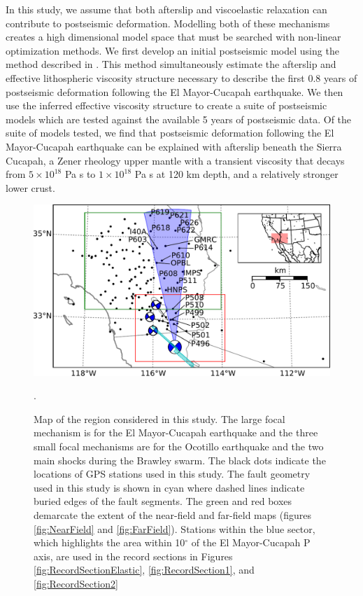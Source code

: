 \documentclass[review]{elsarticle}
\begin{document}
In this study, we assume that both afterslip and viscoelastic relaxation can contribute to postseismic deformation. Modelling both of these mechanisms creates a high dimensional model space that must be searched with non-linear optimization methods. We first develop an initial postseismic model using the method described in \citet{Hines2016}. This method simultaneously estimate the afterslip and effective lithospheric viscosity structure necessary to describe the first 0.8 years of postseismic deformation following the El Mayor-Cucapah earthquake.  We then use the inferred effective viscosity structure to create a suite of postseismic models which are tested against the available 5 years of postseismic data.  Of the suite of models tested, we find that postseismic deformation following the El Mayor-Cucapah earthquake can be explained with afterslip beneath the Sierra Cucapah, a Zener rheology upper mantle with a transient viscosity that decays from $5\times10^{18}$ Pa s to $1\times10^{18}$ Pa s at 120 km depth, and a relatively stronger lower crust. 

\begin{figure}
\includegraphics[scale=0.7]{Figures/ContextMap} 
\caption{Map of the region considered in this study.  The large focal mechanism is for the El Mayor-Cucapah earthquake and the three small focal mechanisms are for the Ocotillo earthquake and the two main shocks during the Brawley swarm.  The black dots indicate the locations of GPS stations used in this study.  The fault geometry used in this study is shown in cyan where dashed lines indicate buried edges of the fault segments.  The green and red boxes demarcate the extent of the near-field and far-field maps (figures \ref{fig:NearField} and \ref{fig:FarField}).  Stations within the blue sector, which highlights the area within 10$^\circ$ of the El Mayor-Cucapah P axis, are used in the record sections in Figures \ref{fig:RecordSectionElastic}, \ref{fig:RecordSection1}, and \ref{fig:RecordSection2}}.       
\label{fig:ContextMap}
\end{figure}
\end{document}
